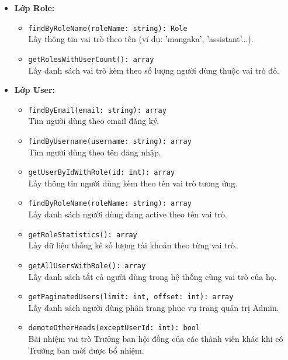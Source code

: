 \begin{itemize}
    \item \textbf{Lớp Role:}
    \begin{itemize}
        \item \texttt{findByRoleName(roleName: string): Role}\\
            Lấy thông tin vai trò theo tên (ví dụ: 'mangaka', 'assistant'...).
        \item \texttt{getRolesWithUserCount(): array}\\
            Lấy danh sách vai trò kèm theo số lượng người dùng thuộc vai trò đó.
    \end{itemize}
    
    \item \textbf{Lớp User:}
    \begin{itemize}
        \item \texttt{findByEmail(email: string): array}\\
            Tìm người dùng theo email đăng ký.
        \item \texttt{findByUsername(username: string): array}\\
            Tìm người dùng theo tên đăng nhập.
        \item \texttt{getUserByIdWithRole(id: int): array}\\
            Lấy thông tin người dùng kèm theo tên vai trò tương ứng.
        \item \texttt{findByRoleName(roleName: string): array}\\
            Lấy danh sách người dùng đang active theo tên vai trò.
        \item \texttt{getRoleStatistics(): array}\\
            Lấy dữ liệu thống kê số lượng tài khoản theo từng vai trò.
        \item \texttt{getAllUsersWithRole(): array}\\
            Lấy danh sách tất cả người dùng trong hệ thống cùng vai trò của họ.
        \item \texttt{getPaginatedUsers(limit: int, offset: int): array}\\
            Lấy danh sách người dùng phân trang phục vụ trang quản trị Admin.
        \item \texttt{demoteOtherHeads(exceptUserId: int): bool}\\
            Bãi nhiệm vai trò Trưởng ban hội đồng của các thành viên khác khi có Trưởng ban mới được bổ nhiệm.
    \end{itemize}


\end{itemize}
